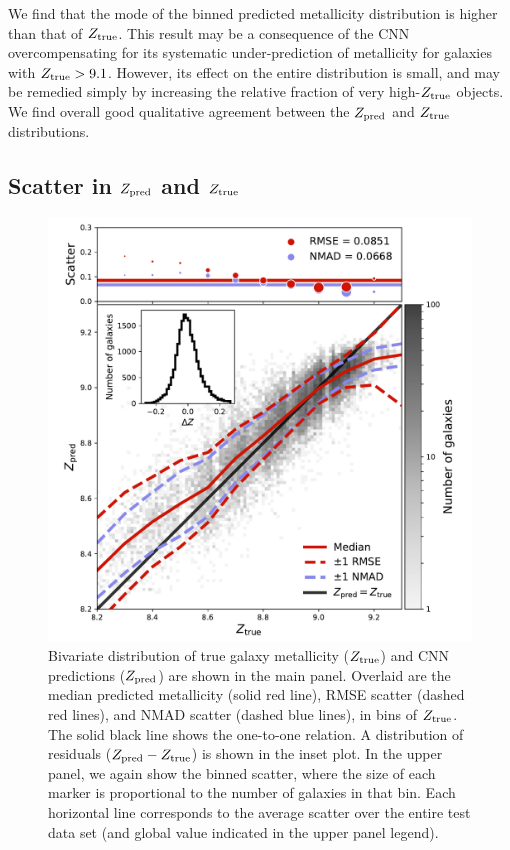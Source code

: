 \documentclass[fleqn,usenatbib]{mnras}
\begin{document}
We find that the mode of the binned predicted metallicity distribution is higher than that of $Z_{\rm true}$. This result may be a consequence of the CNN overcompensating for its systematic under-prediction of metallicity for galaxies with $Z_{\rm true} > 9.1$. However, its effect on the entire distribution is small, and may be remedied simply by increasing the relative fraction of very high-$Z_{\rm true}$ objects. We find overall good qualitative agreement between the $Z_{\rm pred}$ and $Z_{\rm true}$ distributions.

\subsection{Scatter in $Z_{\rm pred}$ and $Z_{\rm true}$}
\begin{figure}
	\includegraphics[width=\columnwidth]{02-prediction_summary.pdf}
	\caption{\label{fig:predicting-metallicity}
		Bivariate distribution of true galaxy metallicity ($Z_{\rm true}$) and CNN predictions ($Z_{\rm pred}$) are shown in the main panel. Overlaid are the median predicted metallicity (solid red line), RMSE scatter (dashed red lines), and NMAD scatter (dashed blue lines), in bins of $Z_{\rm true}$. The solid black line shows the one-to-one relation. A distribution of residuals ($Z_{\rm pred} - Z_{\rm true}$) is shown in the inset plot. In the upper panel, we again show the binned scatter, where the size of each marker is proportional to the number of galaxies in that bin. Each horizontal line corresponds to the average scatter over the entire test data set (and global value indicated in the upper panel legend).}
\end{figure}
\end{document}
